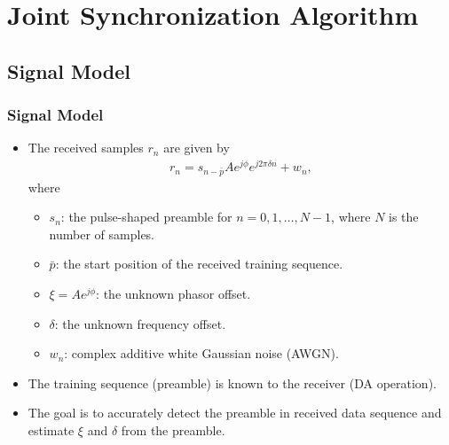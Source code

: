 \section{Joint Synchronization Algorithm}

\subsection{Signal Model}

\begin{frame}
  \frametitle{Signal Model}
  \begin{itemize}
    \item The received samples $r_n$ are given by
    \begin{equation*}
      \begin{aligned}
        \label{eq:model}
        r_n = s_{n-\bar{p}}Ae^{j\phi}e^{j2\pi\delta n}+w_{n},
      \end{aligned}
    \end{equation*}
    where
    \begin{itemize}
        \item $s_n$: the pulse-shaped preamble for $n=0,1,\ldots,N{-}1$, where $N$ is the number of samples.
        \item $\bar{p}$: the start position of the received training sequence.
        \item $\xi=Ae^{j\phi}$: the unknown phasor offset.
        \item $\delta$: the unknown frequency offset.
        \item $w_n$: complex additive white Gaussian noise (AWGN).
    \end{itemize}
    \item The training sequence (preamble) is known to the receiver (DA operation). 
    \item The goal is to accurately detect the preamble in received data sequence and estimate $\xi$ and $\delta$ from the preamble.
\end{itemize}
  
\end{frame}

